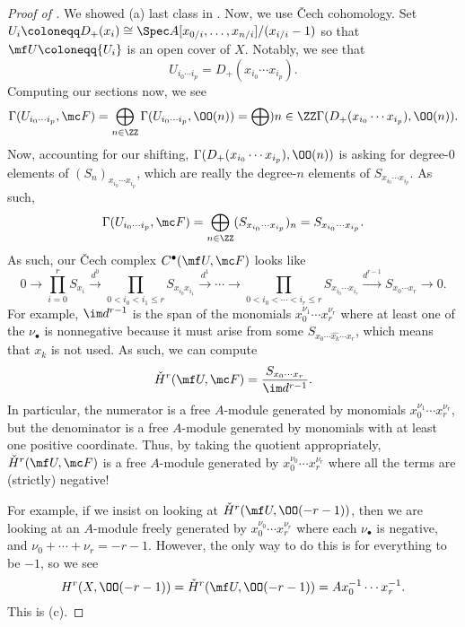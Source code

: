 \documentclass[../notes.tex]{subfiles}
\begin{document}
\begin{proof}[Proof of ]
	We showed (a) last class in . Now, we use \v Cech cohomology. Set $U_i\coloneqq D_+(x_i)\cong\Spec A[x_{0/i},\ldots,x_{n/i}]/(x_{i/i}-1)$ so that $\mf U\coloneqq\{U_i\}$ is an open cover of $X$. Notably, we see that
	\[U_{i_0\cdots i_p}=D_+(x_{i_0}\cdots x_{i_p}).\]
	Computing our sections now, we see
	\[\Gamma(U_{i_0\cdots i_p},\mc F)=\bigoplus_{n\in\ZZ}\Gamma(U_{i_0\cdots i_p},\OO(n))=\bigoplus){n\in\ZZ}\Gamma(D_+(x_{i_0}\cdots x_{i_p}),\OO(n)).\]
	Now, accounting for our shifting, $\Gamma(D_+(x_{i_0}\cdots x_{i_p}),\OO(n))$ is asking for degree-$0$ elements of $(S_n)_{x_{i_0}\cdots x_{i_p}}$, which are really the degree-$n$ elements of $S_{x_{i_0}\cdots x_{i_p}}$. As such,
	\[\Gamma(U_{i_0\cdots i_p},\mc F)=\bigoplus_{n\in\ZZ}(S_{x_{i_0}\cdots x_{i_p}})_n=S_{x_{i_0}\cdots x_{i_p}}.\]
	As such, our \v Cech complex $C^\bullet(\mf U,\mc F)$ looks like
	\[0\to\prod_{i=0}^rS_{x_i}\xrightarrow{d^0}\prod_{0<i_0<i_1\le r}S_{x_{i_0}x_{i_1}}\xrightarrow{d^1}\cdots\to\prod_{0<i_0<\cdots<i_r\le r}S_{x_{i_0}\cdots x_{i_r}}\xrightarrow{d^{r-1}}S_{x_0\cdots x_r}\to0.\]
	For example, $\im d^{r-1}$ is the span of the monomials $x_0^{\nu_1}\cdots x_r^{\nu_r}$ where at least one of the $\nu_\bullet$ is nonnegative because it must arise from some $S_{x_0\cdots\widehat{x_k}\cdots x_r}$, which means that $x_k$ is not used. As such, we can compute
	\[\check H^r(\mf U,\mc F)=\frac{S_{x_0\cdots x_r}}{\im d^{r-1}}.\]
	In particular, the numerator is a free $A$-module generated by monomials $x_0^{\nu_1}\cdots x_r^{\nu_r}$, but the denominator is a free $A$-module generated by monomials with at least one positive coordinate. Thus, by taking the quotient appropriately, $\check H^r(\mf U,\mc F)$ is a free $A$-module generated by $x_0^{\nu_0}\cdots x_r^{\nu_r}$ where all the terms are (strictly) negative!

	For example, if we insist on looking at $\check H^r(\mf U,\OO(-r-1))$, then we are looking at an $A$-module freely generated by $x_0^{\nu_0}\cdots x_r^{\nu_r}$ where each $\nu_\bullet$ is negative, and $\nu_0+\cdots+\nu_r=-r-1$. However, the only way to do this is for everything to be $-1$, so we see
	\[H^r(X,\OO(-r-1))=\check H^r(\mf U,\OO(-r-1))=Ax_0^{-1}\cdots x_r^{-1}.\]
	This is (c).


\end{proof}
\end{document}
